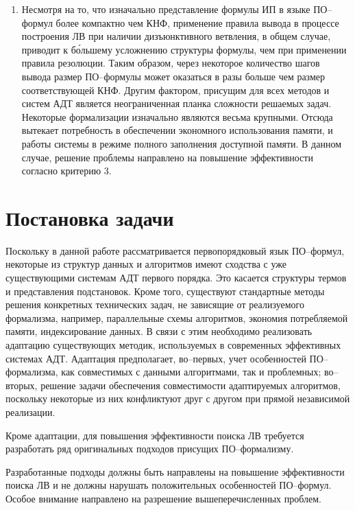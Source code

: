 \begin{enumerate}
\item Несмотря на то, что изначально представление формулы ИП в языке ПО--формул более компактно чем КНФ, применение правила вывода в процессе построения ЛВ при наличии дизъюнктивного ветвления, в общем случае, приводит к б\'{о}льшему усложнению структуры формулы, чем при применении правила резолюции. Таким образом, через некоторое количество шагов вывода размер ПО--формулы может оказаться в разы больше чем размер соответствующей КНФ. Другим фактором, присущим для всех методов и систем АДТ является неограниченная планка сложности решаемых задач. Некоторые формализации изначально являются весьма крупными. Отсюда вытекает потребность в обеспечении экономного использования памяти, и работы системы в режиме полного заполнения доступной памяти. В данном случае, решение проблемы направлено на повышение эффективности согласно критерию 3.
\end{enumerate} 


\section{Постановка задачи}
Поскольку в данной работе рассматривается первопорядковый язык ПО--формул, некоторые из структур данных и алгоритмов имеют сходства с уже существующими системам АДТ первого порядка. Это касается структуры термов и представления подстановок. Кроме того, существуют стандартные методы решения конкретных технических задач, не зависящие от реализуемого формализма, например, параллельные схемы алгоритмов, экономия потребляемой памяти, индексирование данных. В связи с этим необходимо реализовать адаптацию существующих методик, используемых в современных эффективных системах АДТ. Адаптация предполагает, во--первых, учет особенностей ПО--формализма, как совместимых с данными алгоритмами, так и проблемных; во--вторых, решение задачи обеспечения совместимости адаптируемых алгоритмов, поскольку некоторые из них конфликтуют друг с другом при прямой независимой реализации.

Кроме адаптации, для повышения эффективности поиска ЛВ требуется разработать ряд оригинальных подходов присущих ПО--формализму.

Разработанные подходы должны быть направлены на повышение эффективности поиска ЛВ и не должны нарушать положительных особенностей ПО--формул. Особое внимание направлено на разрешение вышеперечисленных проблем.



